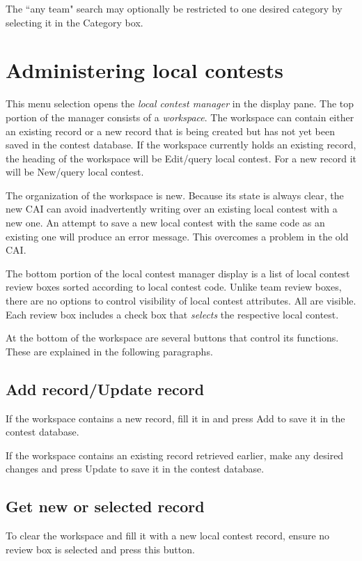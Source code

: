 \documentclass[11pt,letterpaper]{refart}
\def\ui#1{\textsf{#1}}
\begin{document}
The ``any team" search may optionally be restricted to one desired category by selecting
it in the \ui{Category} box.

\section{Administering local contests}
This menu selection opens the \emph{local contest manager} in the display pane.
The top portion of the manager consists of a \emph{workspace}. The workspace
can contain either an existing record or a new record that is being created but has
not yet been saved in the contest database. If the workspace currently holds
an existing record, the heading of the workspace will be 
\ui{Edit/query local contest}. For a new record it will be \ui{New/query local contest}.

The organization of the workspace is new. Because its state is always clear,
the new CAI can avoid inadvertently writing over an existing local contest with a new
one. An attempt to save a new local contest with the same code as an existing
one will produce an error message. This overcomes a problem in the old CAI.

The bottom portion of the local contest manager display
is a list of local contest review boxes sorted according to local contest code. 
Unlike team review boxes, there are no
options to control visibility of local contest attributes. All are visible. Each review
box includes a check box that \emph{selects} the respective local contest.

At the bottom of the workspace are several buttons that control its functions. These
are explained in the following paragraphs.

\subsection{Add record/Update record}
If the workspace contains a new record, fill it in and press \ui{Add} to 
save it in the contest database. 

If the workspace contains an existing record retrieved earlier, make any
desired changes and press \ui{Update} to save it in the contest database.

\subsection{Get new or selected record}
To clear the workspace and fill it with a new local contest record, ensure no 
review box is selected and press this button.
\end{document}
